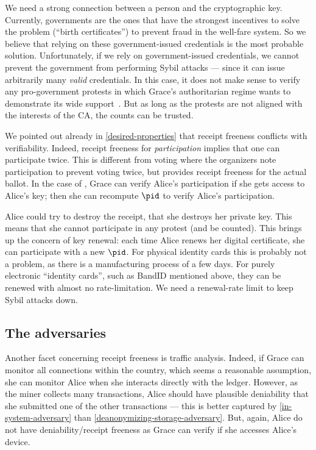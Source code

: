 We need a strong connection between a person and the cryptographic key.
Currently, governments are the ones that have the strongest incentives to solve 
the problem (\enquote{birth certificates}) to prevent \eg fraud in the 
well-fare system.
So we believe that relying on these government-issued credentials is the most 
probable solution.
Unfortunately, if we rely on government-issued credentials, we cannot prevent 
the government from performing Sybil attacks --- since it can issue arbitrarily 
many \emph{valid} credentials.
In this case, it does not make sense to verify any pro-government protests in 
which Grace's authoritarian regime wants to demonstrate its wide 
support~\cite{AlJazeeraOnVenezuela2017,VenezuelanStateWorkersCalledToParticipate}.
But as long as the protests are not aligned with the interests of the \ac{CA}, 
the counts can be trusted.

We pointed out already in \cref{desired-properties} that receipt freeness 
conflicts with verifiability.
Indeed, receipt freeness for \emph{participation} implies that one can 
participate twice.
This is different from voting where the organizers note participation to 
prevent voting twice, but provides receipt freeness for the actual ballot.
In the case of \CROCUS, Grace can verify Alice's participation if she gets 
access to Alice's key; then she can recompute \(\pid\) to verify Alice's 
participation.

Alice could try to destroy the receipt, \ie that she destroys her private key.
This means that she cannot participate in any protest (and be counted).
This brings up the concern of key renewal: each time Alice renews her digital 
certificate, she can participate with a new \(\pid\).
For physical identity cards this is probably not a problem, as there is a 
manufacturing process of a few days.
For purely electronic \enquote{identity cards}, such as BandID mentioned above, 
they can be renewed with almost no rate-limitation.
We need a renewal-rate limit to keep Sybil attacks down.

\subsection{The adversaries}


Another facet concerning receipt freeness is traffic analysis.
Indeed, if Grace can monitor all connections within the country, which seems a 
reasonable assumption, she can monitor Alice when she interacts directly with 
the ledger.
However, as the miner collects many transactions, Alice should have plausible 
deniability that she submitted one of the other transactions --- \ie this is 
better captured by \cref{in-system-adversary} than 
\cref{deanonymizing-storage-adversary}.
But, again, Alice do not have deniability/receipt freeness as Grace can verify 
if she accesses Alice's device.

